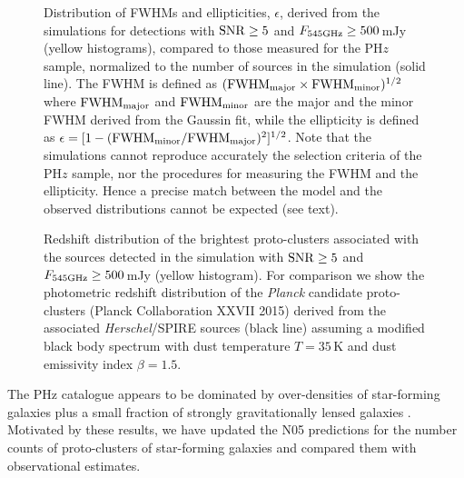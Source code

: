 \documentclass[useAMS,usenatbib]{mn2e}
\begin{document}
\begin{figure}
\vspace{-0.75cm}
\hspace{-4.4cm}
\vspace{-4.8cm}
\caption{Distribution of FWHMs and ellipticities,
  $\epsilon$, derived from the simulations for detections with ${\rm
    SNR}\ge5$ and $F_{\rm 545GHz}\ge500\,$mJy (yellow histograms),
  compared to those measured for the PH$z$ sample, normalized to the number of sources in the simulation (solid line). The FWHM is defined as $({\rm FWHM}_{\rm major}\times
  {\rm FWHM}_{\rm minor})^{1/2}$ where ${\rm FWHM}_{\rm major}$ and ${\rm FWHM}_{\rm minor}$ are the major
and the minor FWHM derived from the Gaussin fit, while the ellipticity is
defined as $\epsilon=[1 - ({\rm FWHM}_{\rm minor}/{\rm FWHM}_{\rm major})^{2}]^{1/2}$. Note that the simulations cannot reproduce accurately the selection criteria of the PH$z$ sample, nor the procedures for measuring the FWHM and the ellipticity. Hence a precise match between the model and the observed distributions cannot be expected (see text). }
\label{fig:FWHM_epsilon}
\end{figure}


\begin{figure}
\vspace{0.0cm}
\hspace{-4.4cm}
\vspace{-0.6cm}
\caption{Redshift distribution of the brightest proto-clusters
  associated with the sources detected in the simulation with ${\rm
    SNR}\ge5$ and $F_{\rm 545GHz}\ge500\,$mJy (yellow histogram). For
  comparison we show the photometric redshift distribution of the {\it
    Planck} candidate proto-clusters (Planck Collaboration XXVII 2015) derived from
   the associated {\it Herschel}/SPIRE sources (black line) assuming a modified black body spectrum with dust temperature
$T=35\,$K and dust emissivity index $\beta=1.5$.}
\label{fig:Nz_clumps}
\end{figure}



The PHz catalogue appears to be dominated by
over-densities of star-forming galaxies plus a small fraction of
strongly gravitationally lensed galaxies \citep[around
3\%;][]{PlanckCollaborationXXVII2015}. Motivated by these results, we
have updated the N05  predictions for the number
counts of proto-clusters of star-forming galaxies and compared them
with observational estimates.
\end{document}
